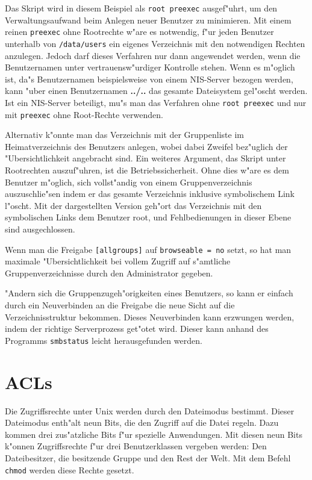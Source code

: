 \documentclass{scrartcl}\usepackage{pslatex}\typearea{12}
\newcommand{\prog}{\texttt}
\newcommand{\param}{\texttt}
\newcommand{\username}{\textbf}
\begin{document}
Das Skript wird in diesem Beispiel als \param{root preexec}
ausgef"uhrt, um den Verwaltungsaufwand beim Anlegen neuer Benutzer zu
minimieren. Mit einem reinen \param{preexec} ohne Rootrechte w"are es
notwendig, f"ur jeden Benutzer unterhalb von \param{/data/users} ein
eigenes Verzeichnis mit den notwendigen Rechten anzulegen. Jedoch darf dieses
Verfahren nur dann angewendet werden, wenn die Benutzernamen unter
vertrauensw"urdiger Kontrolle stehen. Wenn es m"oglich ist, da"s
Benutzernamen beispielsweise von einem NIS-Server bezogen werden, kann "uber
einen Benutzernamen \username{../..} das gesamte Dateisystem
gel"oscht werden. Ist ein NIS-Server beteiligt, mu"s man das Verfahren
ohne \param{root preexec} und nur mit \param{preexec} ohne Root-Rechte
verwenden.

Alternativ k"onnte man das Verzeichnis mit der Gruppenliste im
Heimatverzeichnis des Benutzers anlegen, wobei dabei Zweifel
bez"uglich der "Ubersichtlichkeit angebracht sind. Ein weiteres
Argument, das Skript unter Rootrechten auszuf"uhren, ist die
Betriebssicherheit. Ohne dies w"are es dem Benutzer m"oglich, sich
vollst"andig von einem Gruppenverzeichnis auszuschlie"sen indem er das
gesamte Verzeichnis inklusive symbolischem Link l"oscht. Mit der
dargestellten Version geh"ort das Verzeichnis mit den symbolischen
Links dem Benutzer root, und Fehlbedienungen in dieser Ebene sind
ausgechlossen.

Wenn man die Freigabe \param{[allgroups]} auf \param{browseable =
  no} setzt, so hat man maximale "Ubersichtlichkeit bei vollem
Zugriff auf s"amtliche Gruppenverzeichnisse durch den Administrator
gegeben.

"Andern sich die Gruppenzugeh"origkeiten eines Benutzers, so kann
er einfach durch ein Neuverbinden an die Freigabe die neue Sicht auf
die Verzeichnisstruktur bekommen. Dieses Neuverbinden kann erzwungen
werden, indem der richtige Serverprozess get"otet wird. Dieser kann
anhand des Programms \prog{smbstatus} leicht herausgefunden werden.

\section{ACLs}
\label{acl}

Die Zugriffsrechte unter Unix werden durch den Dateimodus bestimmt.
Dieser Dateimodus enth"alt neun Bits, die den Zugriff auf die Datei
regeln. Dazu kommen drei zus"atzliche Bits f"ur spezielle Anwendungen.
Mit diesen neun Bits k"onnen Zugriffsrechte f"ur drei Benutzerklassen
vergeben werden: Den Dateibesitzer, die besitzende Gruppe und den Rest
der Welt. Mit dem Befehl \prog{chmod} werden diese Rechte gesetzt.
\end{document}
